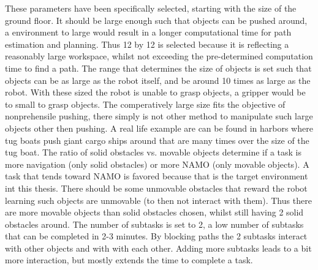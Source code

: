 These parameters have been specifically selected, starting with the size of the ground floor. It should be large enough such that objects can be pushed around, a environment to large would result in a longer computational time for path estimation and planning. Thus 12 by 12 is selected because it is reflecting a reasonably large workspace, whilst not exceeding the pre-determined computation time to find a path. The range that determines the size of objects is set such that objects can be as large as the robot itself, and be around 10 times as large as the robot. With these sized the robot is unable to grasp objects, a gripper would be to small to grasp objects. The comperatively large size fits the objective of nonprehensile pushing, there simply is not other method to manipulate such large objects other then pushing. A real life example are can be found in harbors where tug boats push giant cargo ships around that are many times over the size of the tug boat. The ratio of solid obstacles vs. movable objects determine if a task is more navigation (only solid obstacles) or more \ac{NAMO} (only movable objects). A task that tends toward \ac{NAMO} is favored because that is the target environment int this thesis. There should be some unmovable obstacles that reward the robot learning such objects are unmovable (to then not interact with them). Thus there are more movable objects than solid obstacles chosen, whilst still having 2 solid obstacles around. The number of subtasks is set to 2, a low number of subtasks that can be completed in 2-3 minutes. By blocking paths the 2 subtasks interact with other objects and with with each other. Adding more subtasks leads to a bit more interaction, but mostly extends the time to complete a task. 

